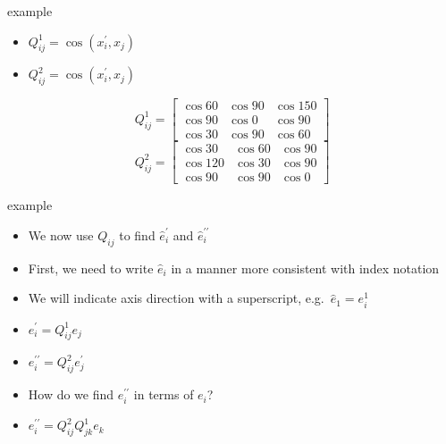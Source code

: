 \documentclass[
  letterpaper,
  ignorenonframetext,
  aspectratio=43,
  handout,
  12pt]{beamer}
\providecommand{\tightlist}{%
  \setlength{\itemsep}{0pt}\setlength{\parskip}{0pt}}
\providecommand{\tightlist}{%
\setlength{\itemsep}{0pt}\setlength{\parskip}{0pt}}
\begin{document}
\begin{frame}{example}
\protect\hypertarget{example-8}{}
\begin{itemize}
\tightlist
\item
  \(Q_{ij}^1 = \cos(x_i^\prime, x_j)\)
\item
  \(Q_{ij}^2 = \cos(x_i^\prime, x_j)\)
\end{itemize}

\[Q_{ij}^1 = \begin{bmatrix}
\cos 60 & \cos 90 & \cos 150\\
\cos 90 & \cos 0 & \cos 90\\
\cos 30 & \cos 90 & \cos 60
\end{bmatrix}\] \[Q_{ij}^2 = \begin{bmatrix}
\cos 30 & \cos 60 & \cos 90\\
\cos 120 & \cos 30 & \cos 90\\
\cos 90 & \cos 90 & \cos 0
\end{bmatrix}\]
\end{frame}

\begin{frame}{example}
\protect\hypertarget{example-9}{}
\begin{itemize}
\tightlist
\item
  We now use \(Q_{ij}\) to find \(\hat{e}_i^\prime\) and
  \(\hat{e}_i^{\prime \prime}\)
\item
  First, we need to write \(\hat{e}_i\) in a manner more consistent with
  index notation
\item
  We will indicate axis direction with a superscript,
  e.g.~\(\hat{e}_1 = e_i^1\)
\item
  \(e_i^\prime = Q_{ij}^1 e_j\)
\item
  \(e_i^{\prime \prime} = Q_{ij}^2 e_j^\prime\)
\item
  How do we find \(e_i^{\prime \prime}\) in terms of \(e_i\)?
\item
  \(e_i^{\prime \prime} = Q_{ij}^2 Q_{jk}^1 e_k\)
\end{itemize}
\end{frame}
\end{document}
